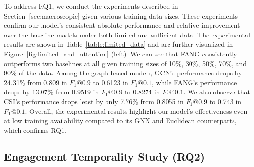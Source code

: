 \documentclass[sigconf,anonymous]{acmart}
\theoremstyle{definition}
\theoremstyle{hypothesis}
\begin{document}
To address RQ1, we conduct the experiments described in Section~\ref{sec:macroscopic} given various training data sizes. These experiments confirm our model's consistent absolute performance and relative improvement over the baseline models under both limited and sufficient data.
The experimental results are shown in Table~\ref{table:limited_data} and are further visualized in Figure~\ref{fig:limited_and_attention} (left).
We can see that FANG consistently outperforms two baselines at all given training sizes of 10\%, 30\%, 50\%, 70\%, and 90\% of the data. Among the graph-based models, GCN's performance drops by 24.31\% from 0.809 in $F_1@0.9$ to 0.6123 in $F_1@0.1$, while FANG's performance drops by 13.07\% from 0.9519 in $F_1@0.9$ to 0.8274 in $F_1@0.1$. We also observe that CSI's performance drops least by only 7.76\% from 0.8055 in $F_1@0.9$ to 0.743 in $F_1@0.1$. 
Overall, the experimental results highlight our model's effectiveness even at low training availability compared to its GNN and Euclidean counterparts, which confirms RQ1. 

\subsection{Engagement Temporality Study (RQ2)} 
\end{document}
